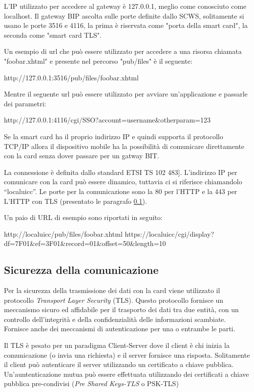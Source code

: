 L'IP utilizzato per accedere al gateway è 127.0.0.1, meglio come conosciuto come localhost. Il gateway BIP ascolta sulle porte definite dallo SCWS, solitamente si usano le porte 3516 e 4116, la prima è riservata come "porta della smart card", la seconda come "smart card TLS".

Un esempio di url che può essere utilizzato per accedere a una risorsa chiamata "foobar.xhtml" e presente nel percorso "pub/files" è il seguente:
\begin{center}
    http://127.0.0.1:3516/pub/files/foobar.xhtml 
\end{center}

Mentre il seguente url può essere utilizzato per avviare un'applicazione e passarle dei parametri:
\begin{center}
    http://127.0.0.1:4116/cgi/SSO?account=username\&otherparam=123 
\end{center}

Se la smart card ha il proprio indirizzo IP e quindi supporta il protocollo TCP/IP allora il dispositivo mobile ha la possibilità di comunicare direttamente con la card senza dover passare per un gatway BIT.

La connessione è definita dallo standard ETSI TS 102 483]. L'indirizzo IP per comunicare con la card può essere dinamico, tuttavia ci si riferisce chiamandolo “localuicc”. Le porte per la comunicazione sono la 80 per l'HTTP e la 443 per L'HTTP con TLS (presentato le paragrafo \ref{tls}).

Un paio di URL di esempio sono riportati in seguito:
\begin{center}
    http://localuicc/pub/files/foobar.xhtml
    https://localuicc/cgi/display?df=7F01\&ef=3F01\&record=01\&offset=50\&length=10 
\end{center}

\subsection{Sicurezza della comunicazione}
\label{tls}
Per la sicurezza della trasmissione dei dati con la card viene utilizzato il protocollo \textit{Transport Layer Security}  (TLS). Questo protocollo fornisce un meccanismo sicuro ed affidabile per il trasporto dei dati tra due entità, con un controllo dell'integrità e della confidenzialità delle informazioni scambiate. Fornisce anche dei meccanismi di autenticazione per una o entrambe le parti.

Il TLS è pesato per un paradigma Client-Server dove il client è chi inizia la comunicazione (o invia una richiesta) e il server fornisce una risposta. Solitamente il client può autenticare il server utilizzando un certificato a chiave pubblica. Un'auntenticazione mutua può essere effettuata utilizzando dei certificati a chiave pubblica pre-condivisi (\textit{Pre Shared Keys-TLS} o PSK-TLS)
\cite{scwebserver}